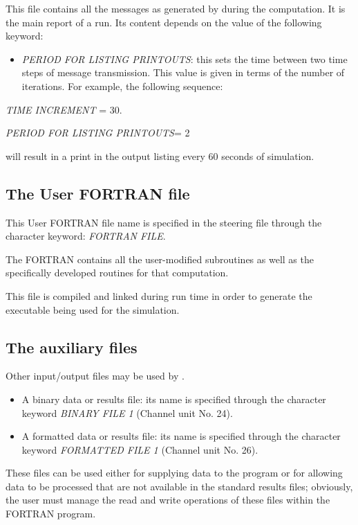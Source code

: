  This file contains all the messages as generated by \tomawac during the computation. It is the main report of a \tomawac run. Its content depends on the value of the following keyword:

\begin{itemize}
\item  \textit{PERIOD FOR LISTING PRINTOUTS}: this sets the time between two time steps of message transmission. This value is given in terms of the number of iterations. For example, the following sequence:
\end{itemize}

\textit{TIME INCREMENT} = 30.    

\textit{PERIOD FOR LISTING PRINTOUTS}= 2 

will result in a print in the output listing every 60 seconds of simulation.

\subsection{ The User FORTRAN file}

 This User FORTRAN file name is specified in the steering file through the character keyword: \textit{FORTRAN FILE}.\textit{}

 The FORTRAN contains all the user-modified \tomawac subroutines as well as the specifically developed routines for that computation.

 This file is compiled and linked during run time in order to generate the executable being used for the simulation.


\subsection{ The auxiliary files}

 Other input/output files may be used by \tomawac.

\begin{itemize}
\item  A binary data or results file: its name is specified through the character keyword \textit{BINARY FILE 1} (Channel unit No. 24).
\item  A formatted data or results file: its name is specified through the character keyword \textit{FORMATTED FILE 1} (Channel unit No. 26).
\end{itemize}

 These files can be used either for supplying data to the program or for allowing data to be processed that are not available in the standard results files; obviously, the user must manage the read and write operations of these files within the FORTRAN program.


